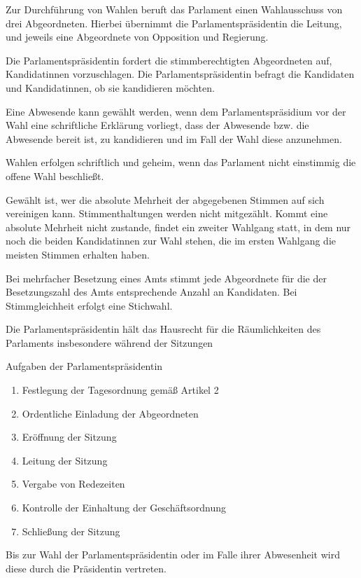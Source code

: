 \documentclass{sasbase}
\begin{document}
\begin{article}[Wahl]
\item Zur Durchführung von Wahlen beruft das Parlament einen Wahlausschuss von drei Abgeordneten. Hierbei \"{u}bernimmt die Parlamentspr\"{a}sidentin die Leitung, und jeweils eine Abgeordnete von Opposition und Regierung.
\item Die Parlamentspr\"{a}sidentin fordert die stimmberechtigten Abgeordneten auf, Kandidatinnen vorzuschlagen. Die Parlamentspr\"{a}sidentin befragt die Kandidaten und Kandidatinnen, ob sie kandidieren möchten.
\item Eine Abwesende kann gewählt werden, wenn dem Parlamentspr\"{a}sidium vor der Wahl eine schriftliche Erklärung vorliegt, dass der Abwesende bzw. die Abwesende bereit ist, zu kandidieren und im Fall der Wahl diese anzunehmen.
\item Wahlen erfolgen schriftlich und geheim, wenn das Parlament nicht einstimmig die offene Wahl beschließt.
\item Gewählt ist, wer die absolute Mehrheit der abgegebenen Stimmen auf sich vereinigen kann. Stimmenthaltungen werden nicht mitgezählt. Kommt eine absolute Mehrheit nicht zustande, findet ein zweiter Wahlgang statt, in dem nur noch die beiden Kandidatinnen zur Wahl stehen, die im ersten Wahlgang die meisten Stimmen erhalten haben.
\item Bei mehrfacher Besetzung eines Amts stimmt jede Abgeordnete für die der Besetzungszahl des Amts
    entsprechende Anzahl an Kandidaten. Bei Stimmgleichheit erfolgt eine Stichwahl.
\end{article}
\begin{article}[Parlamentspräsidentin]
    \item Die Parlamentspräsidentin hält das Hausrecht für die Räumlichkeiten des Parlaments
        insbesondere während der Sitzungen
    \item Aufgaben der Parlamentspräsidentin
    \begin{enumerate}
        \item Festlegung der Tagesordnung gemäß Artikel 2
        \item Ordentliche Einladung der Abgeordneten
        \item Eröffnung der Sitzung
        \item Leitung der Sitzung
        \item Vergabe von Redezeiten
        \item Kontrolle der Einhaltung der Geschäftsordnung
        \item Schließung der Sitzung
    \end{enumerate}
    \item Bis zur Wahl der Parlamentspräsidentin oder im Falle ihrer Abwesenheit wird diese durch
        die Präsidentin vertreten.
\end{article}
\end{document}
